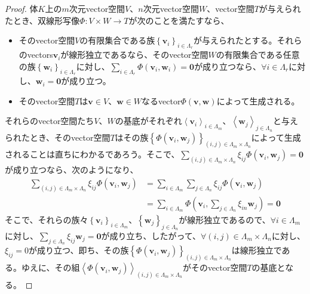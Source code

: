 \documentclass[dvipdfmx]{jsarticle}
\begin{document}
\begin{proof}
体$K$上の$m$次元vector空間$V$、$n$次元vector空間$W$、vector空間$T$が与えられたとき、双線形写像$\varPhi:V \times W \rightarrow T$が次のことを満たすなら、
\begin{itemize}
\item
  そのvector空間$V$の有限集合である族$\left\{ \mathbf{v}_{i} \right\}_{i \in \varLambda_{r}}$が与えられたとする。それらのvectors$\mathbf{v}_{i}$が線形独立であるなら、そのvector空間$W$の有限集合である任意の族$\left\{ \mathbf{w}_{i} \right\}_{i \in \varLambda_{r}}$に対し、$\sum_{i \in \varLambda_{r}} {\varPhi\left( \mathbf{v}_{i},\mathbf{w}_{i} \right)} = \mathbf{0}$が成り立つなら、$\forall i \in \varLambda_{r}$に対し、$\mathbf{w}_{i} = \mathbf{0}$が成り立つ。
\item
  そのvector空間$T$は$\mathbf{v} \in V$、$\mathbf{w} \in W$なるvector$\varPhi\left( \mathbf{v},\mathbf{w} \right)$によって生成される。
\end{itemize}
それらのvector空間たち$V$、$W$の基底がそれぞれ$\left\langle \mathbf{v}_{i} \right\rangle_{i \in \varLambda_{m}}$、$\left\langle \mathbf{w}_{j} \right\rangle_{j \in \varLambda_{n}}$と与えられたとき、そのvector空間$T$はその族$\left\{ \varPhi\left( \mathbf{v}_{i},\mathbf{w}_{j} \right) \right\}_{(i,j) \in \varLambda_{m}\times \varLambda_{n}}$によって生成されることは直ちにわかるであろう。そこで、$\sum_{(i,j) \in \varLambda_{m} \times \varLambda_{n}} {\xi_{ij}\varPhi\left( \mathbf{v}_{i},\mathbf{w}_{j} \right)} = \mathbf{0}$が成り立つなら、次のようになり、
\begin{align*}
\sum_{(i,j) \in \varLambda_{m} \times \varLambda_{n}} {\xi_{ij}\varPhi\left( \mathbf{v}_{i},\mathbf{w}_{j} \right)} &= \sum_{i \in \varLambda_{m}} {\sum_{j \in \varLambda_{n}} {\xi_{ij}\varPhi\left( \mathbf{v}_{i},\mathbf{w}_{j} \right)}}\\
&= \sum_{i \in \varLambda_{m}} {\varPhi\left( \mathbf{v}_{i},\sum_{j \in \varLambda_{n}} {\xi_{in}\mathbf{w}_{j}} \right)} = \mathbf{0}
\end{align*}
そこで、それらの族々$\left\{ \mathbf{v}_{i} \right\}_{i \in \varLambda_{m}}$、$\left\{ \mathbf{w}_{j} \right\}_{j \in \varLambda_{n}}$が線形独立であるので、$\forall i \in \varLambda_{m}$に対し、$\sum_{j \in \varLambda_{n}} {\xi_{ij}\mathbf{w}_{j}} = \mathbf{0}$が成り立ち、したがって、$\forall(i,j) \in \varLambda_{m} \times \varLambda_{n}$に対し、$\xi_{ij} = 0$が成り立つ、即ち、その族$\left\{\varPhi\left( \mathbf{v}_{i},\mathbf{w}_{j} \right)\right\}_{(i,j) \in \varLambda_{m} \times \varLambda_{n}}$は線形独立である。ゆえに、その組$\left\langle \varPhi\left( \mathbf{v}_{i},\mathbf{w}_{j} \right) \right\rangle_{(i,j) \in \varLambda_{m} \times \varLambda_{n}}$がそのvector空間$T$の基底となる。\par

\end{proof}
\end{document}
